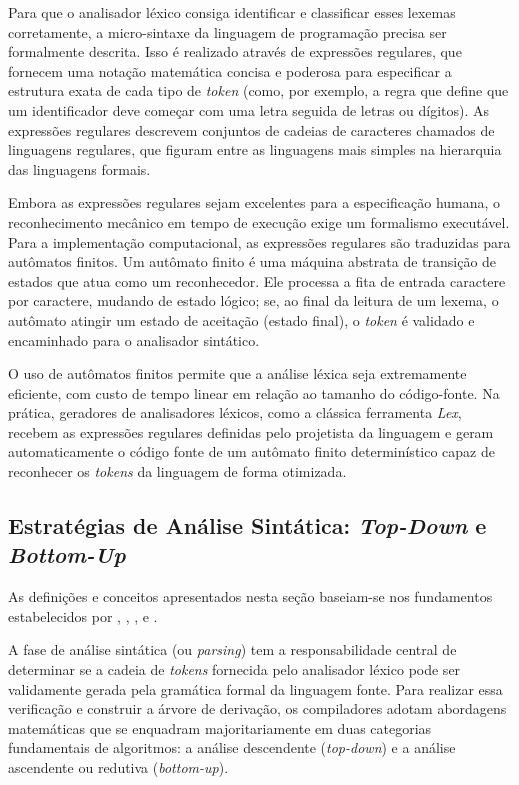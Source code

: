 Para que o analisador léxico consiga identificar e classificar esses lexemas corretamente, a micro-sintaxe da linguagem de programação precisa ser formalmente descrita. Isso é realizado através de expressões regulares, que fornecem uma notação matemática concisa e poderosa para especificar a estrutura exata de cada tipo de \textit{token} (como, por exemplo, a regra que define que um identificador deve começar com uma letra seguida de letras ou dígitos). As expressões regulares descrevem conjuntos de cadeias de caracteres chamados de linguagens regulares, que figuram entre as linguagens mais simples na hierarquia das linguagens formais.

Embora as expressões regulares sejam excelentes para a especificação humana, o reconhecimento mecânico em tempo de execução exige um formalismo executável. Para a implementação computacional, as expressões regulares são traduzidas para autômatos finitos. Um autômato finito é uma máquina abstrata de transição de estados que atua como um reconhecedor. Ele processa a fita de entrada caractere por caractere, mudando de estado lógico; se, ao final da leitura de um lexema, o autômato atingir um estado de aceitação (estado final), o \textit{token} é validado e encaminhado para o analisador sintático.

O uso de autômatos finitos permite que a análise léxica seja extremamente eficiente, com custo de tempo linear em relação ao tamanho do código-fonte. Na prática, geradores de analisadores léxicos, como a clássica ferramenta \textit{Lex}, recebem as expressões regulares definidas pelo projetista da linguagem e geram automaticamente o código fonte de um autômato finito determinístico capaz de reconhecer os \textit{tokens} da linguagem de forma otimizada.


\subsection{Estratégias de Análise Sintática: \textit{Top-Down} e \textit{Bottom-Up}}

As definições e conceitos apresentados nesta seção baseiam-se nos fundamentos estabelecidos por , , ,  e .

A fase de análise sintática (ou \textit{parsing}) tem a responsabilidade central de determinar se a cadeia de \textit{tokens} fornecida pelo analisador léxico pode ser validamente gerada pela gramática formal da linguagem fonte. Para realizar essa verificação e construir a árvore de derivação, os compiladores adotam abordagens matemáticas que se enquadram majoritariamente em duas categorias fundamentais de algoritmos: a análise descendente (\textit{top-down}) e a análise ascendente ou redutiva (\textit{bottom-up}).


